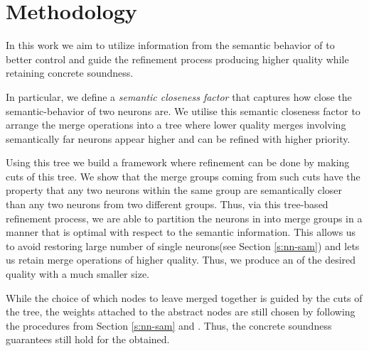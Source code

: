 \section{Methodology}


 
In this work we aim to utilize information from the semantic behavior of \cnc to
better control and guide the refinement process producing higher quality \abs
while retaining concrete soundness. 

In particular, we define a \textit{semantic
closeness factor} that captures how close the semantic-behavior of two 
neurons are. We utilise this semantic closeness factor to arrange the merge
operations into a tree where lower quality merges involving semantically far
neurons appear higher and can be refined with higher priority. 

Using this tree we build a framework  where refinement can
be done by making cuts of this tree. We show that the merge groups coming from
such cuts have the property that any two neurons within the same group are 
semantically closer than any two neurons from two different groups. Thus, via
this tree-based refinement process, we are able to partition the neurons in \cnc
into merge groups in a manner that is
optimal with respect to the semantic information.
This allows us to avoid restoring large number of single neurons(see Section
\ref{s:nn-sam}) and lets us retain merge operations of higher quality. Thus, we
produce an \abs of the desired quality with a much smaller size. 

While the choice of which nodes to leave merged together is guided by the cuts
of the tree, the weights attached to the abstract nodes are still chosen
by following the procedures from Section \ref{s:nn-sam} and \cite{cegar-nn}.
Thus, the concrete soundness guarantees still hold for the \abs obtained.


